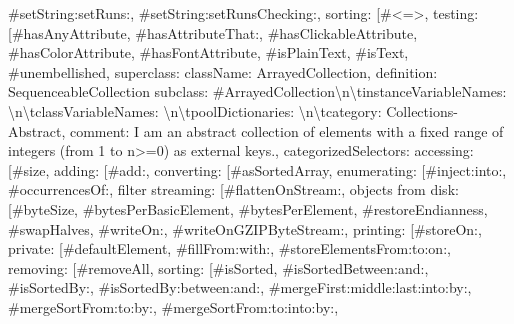 {\textquotedbl{}\#setString:setRuns:\textquotedbl{}, \textquotedbl{}\#setString:setRunsChecking:\textquotedbl{}{]}, \textquotedbl{}sorting\textquotedbl{}: {[}\textquotedbl{}\#<=>\textquotedbl{}{]}, \textquotedbl{}testing\textquotedbl{}: {[}\textquotedbl{}\#hasAnyAttribute\textquotedbl{}, \textquotedbl{}\#hasAttributeThat:\textquotedbl{}, \textquotedbl{}\#hasClickableAttribute\textquotedbl{}, \textquotedbl{}\#hasColorAttribute\textquotedbl{}, \textquotedbl{}\#hasFontAttribute\textquotedbl{}, \textquotedbl{}\#isPlainText\textquotedbl{}, \textquotedbl{}\#isText\textquotedbl{}, \textquotedbl{}\#unembellished\textquotedbl{}{]}\textbraceright , \textquotedbl{}superclass\textquotedbl{}: \textbraceleft \textquotedbl{}className\textquotedbl{}: \textquotedbl{}ArrayedCollection\textquotedbl{}, \textquotedbl{}definition\textquotedbl{}: \textquotedbl{}SequenceableCollection subclass: \#ArrayedCollection\allowbreak\textbackslash n\allowbreak\textbackslash tinstanceVariableNames: \textquotesingle{}\textquotesingle{}\allowbreak\textbackslash n\allowbreak\textbackslash tclassVariableNames: \textquotesingle{}\textquotesingle{}\allowbreak\textbackslash n\allowbreak\textbackslash tpoolDictionaries: \textquotesingle{}\textquotesingle{}\allowbreak\textbackslash n\allowbreak\textbackslash tcategory: \textquotesingle{}Collections-Abstract\textquotesingle{}\textquotedbl{}, \textquotedbl{}comment\textquotedbl{}: \textquotedbl{}I am an abstract collection of elements with a fixed range of integers (from 1 to n>=0) as external keys.\textquotedbl{}, \textquotedbl{}categorizedSelectors\textquotedbl{}: \textbraceleft \textquotedbl{}accessing\textquotedbl{}: {[}\textquotedbl{}\#size\textquotedbl{}{]}, \textquotedbl{}adding\textquotedbl{}: {[}\textquotedbl{}\#add:\textquotedbl{}{]}, \textquotedbl{}converting\textquotedbl{}: {[}\textquotedbl{}\#asSortedArray\textquotedbl{}{]}, \textquotedbl{}enumerating\textquotedbl{}: {[}\textquotedbl{}\#inject:into:\textquotedbl{}, \textquotedbl{}\#occurrencesOf:\textquotedbl{}{]}, \textquotedbl{}filter streaming\textquotedbl{}: {[}\textquotedbl{}\#flattenOnStream:\textquotedbl{}{]}, \textquotedbl{}objects from disk\textquotedbl{}: {[}\textquotedbl{}\#byteSize\textquotedbl{}, \textquotedbl{}\#bytesPerBasicElement\textquotedbl{}, \textquotedbl{}\#bytesPerElement\textquotedbl{}, \textquotedbl{}\#restoreEndianness\textquotedbl{}, \textquotedbl{}\#swapHalves\textquotedbl{}, \textquotedbl{}\#writeOn:\textquotedbl{}, \textquotedbl{}\#writeOnGZIPByteStream:\textquotedbl{}{]}, \textquotedbl{}printing\textquotedbl{}: {[}\textquotedbl{}\#storeOn:\textquotedbl{}{]}, \textquotedbl{}private\textquotedbl{}: {[}\textquotedbl{}\#defaultElement\textquotedbl{}, \textquotedbl{}\#fillFrom:with:\textquotedbl{}, \textquotedbl{}\#storeElementsFrom:to:on:\textquotedbl{}{]}, \textquotedbl{}removing\textquotedbl{}: {[}\textquotedbl{}\#removeAll\textquotedbl{}{]}, \textquotedbl{}sorting\textquotedbl{}: {[}\textquotedbl{}\#isSorted\textquotedbl{}, \textquotedbl{}\#isSortedBetween:and:\textquotedbl{}, \textquotedbl{}\#isSortedBy:\textquotedbl{}, \textquotedbl{}\#isSortedBy:between:and:\textquotedbl{}, \textquotedbl{}\#mergeFirst:middle:last:into:by:\textquotedbl{}, \textquotedbl{}\#mergeSortFrom:to:by:\textquotedbl{}, \textquotedbl{}\#mergeSortFrom:to:into:by:\textquotedbl{}, }
